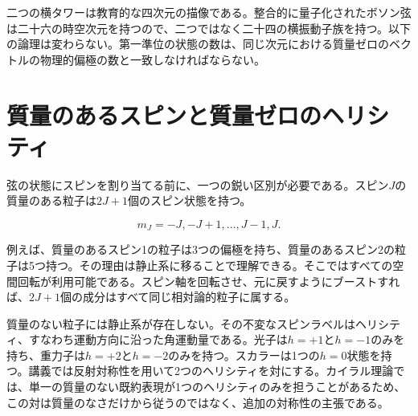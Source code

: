 \begin{classroomqa}
\end{classroomqa}

\begin{classroomqa}
\end{classroomqa}

二つの横タワーは教育的な四次元の描像である。整合的に量子化されたボソン弦は二十六の時空次元を持つので、二つではなく二十四の横振動子族を持つ。以下の論理は変わらない。第一準位の状態の数は、同じ次元における質量ゼロのベクトルの物理的偏極の数と一致しなければならない。

\section{質量のあるスピンと質量ゼロのヘリシティ}

弦の状態にスピンを割り当てる前に、一つの鋭い区別が必要である。スピン\(J\)の質量のある粒子は\(2J+1\)個のスピン状態を持つ。

\begin{equation}
  m_J=-J,-J+1,\ldots,J-1,J.
  \label{eq:l03-massive-spin-multiplet}
\end{equation}

例えば、質量のあるスピン1の粒子は3つの偏極を持ち、質量のあるスピン2の粒子は5つ持つ。その理由は静止系に移ることで理解できる。そこではすべての空間回転が利用可能である。スピン軸を回転させ、元に戻すようにブーストすれば、\(2J+1\)個の成分はすべて同じ相対論的粒子に属する。

質量のない粒子には静止系が存在しない。その不変なスピンラベルはヘリシティ、すなわち運動方向に沿った角運動量である。光子は\(h=+1\)と\(h=-1\)のみを持ち、重力子は\(h=+2\)と\(h=-2\)のみを持つ。スカラーは1つの\(h=0\)状態を持つ。講義では反射対称性を用いて2つのヘリシティを対にする。カイラル理論では、単一の質量のない既約表現が1つのヘリシティのみを担うことがあるため、この対は質量のなさだけから従うのではなく、追加の対称性の主張である。


